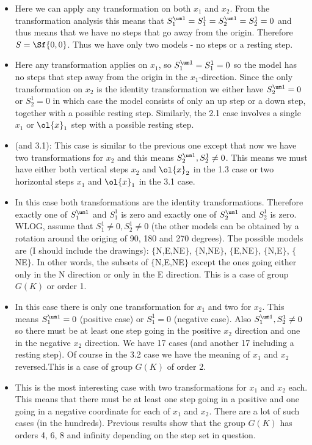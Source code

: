 \begin{itemize}
\item [Case 1.1:] Here we can apply any transformation on both $x_1$ and $x_2$. From the transformation analysis this means that $S_1^{\um 1} = S_1^1 = S_2^{\um 1} = S_2^1 = 0$ and thus means that we have no steps that go away from the origin. Therefore $S = \Sf{0,0}$. Thus we have only two models - no steps or a resting step. 
\item[Case 1.2:] Here any transformation applies on $x_1$, so $S_1^{\um 1} = S_1^1 = 0$ so the model has no steps that step away from the origin in the $x_1$-direction. Since the only transformation on $x_2$ is the identity transformation we either have $S_2^{\um 1} = 0$ or $S_2^1 = 0$ in which case the model consists of only an up step or a down step, together with a possible resting step. Similarly, the 2.1 case involves a single $x_1$ or $\ol{x}_1$ step with a possible resting step.
\item[Case 1.3:] (and 3.1): This case is similar to the previous one except that now we have two transformations for $x_2$ and this means $S_2^{\um 1}, S_2^1 \neq 0$. This means we must have either both vertical steps $x_2$ and $\ol{x}_2$ in the 1.3 case or two horizontal steps $x_1$ and $\ol{x}_1$ in the 3.1 case.
\item[Case 2.2:] In this case both transformations are the identity transformations. Therefore exactly one of $S_1^{\um 1}$ and $S_1^1$ is zero and exactly one of $S_2^{\um 1}$ and $S_2^1$ is zero. WLOG, assume that $S_1^1 \neq 0, S_2^1 \neq 0$ (the other models can be obtained by a rotation around the origing of 90, 180 and 270 degrees). The possible models are (I should include the drawings): $\{$N,E,NE$\}$, $\{$N,NE$\}$, $\{$E,NE$\}$, $\{$N,E$\}$, $\{$NE$\}$. In other words, the subsets of $\{$N,E,NE$\}$ except the ones going either only in the N direction or only in the E direction. This is a case of group $G(K)$ or order 1.
\item[Case 2.3:] In this case there is only one transformation for $x_1$ and two for $x_2$. This means $S_1^{\um 1} = 0$ (positive case) or $S_1^{1} = 0$ (negative case). Also $S_1^{\um 1}, S_2^1 \neq 0$ so there must be at least one step going in the positive $x_2$ direction and one in the negative $x_2$ direction. We have 17 cases (and another 17 including a resting step). Of course in the 3.2 case we have the meaning of $x_1$ and $x_2$ reversed.This is a case of group $G(K)$ of order 2.
\item[Case 3.3:] This is the most interesting case with two transformations for $x_1$ and $x_2$ each. This means that there must be at least one step going in a positive and one going in a negative coordinate for each of $x_1$ and $x_2$. There are a lot of such cases (in the hundreds). Previous results show that the group $G(K)$ has orders 4, 6, 8 and infinity depending on the step set in question.
 \end{itemize}
 
